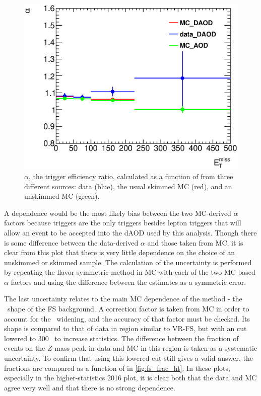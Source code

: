 \begin{centering}
\begin{figure}[!hbt]
\myfloatalign
\includegraphics[width=.85\linewidth]{figures/fs/trigger_ratios.eps}
\caption{$\alpha$, the trigger efficiency ratio, calculated as a function of \met from three different sources: data (blue), the usual skimmed \ttbar \ac{MC} (red), and an unskimmed \ttbar \ac{MC} (green).}
\label{fig:fs_alpha}
\end{figure}
\end{centering}

A \met dependence would be the most likely bias between the two \ac{MC}-derived $\alpha$ factors because \met triggers are the only triggers besides lepton triggers that will allow an event to be accepted into the \ac{dAOD} used by this analysis. Though there is some difference between the data-derived $\alpha$ and those taken from \ac{MC}, it is clear from this plot that there is very little dependence on the choice of an unskimmed or skimmed sample. The calculation of the uncertainty is performed by repeating the flavor symmetric method in \ac{MC} with each of the two \ac{MC}-based $\alpha$ factors and using the difference between the estimates as a symmetric error.

The last uncertainty relates to the main \ac{MC} dependence of the method - the \mll~shape of the \ac{FS} background. A correction factor is taken from \ac{MC} in order to account for the \mll~widening, and the accuracy of that factor must be checked. Its shape is compared to that of data in region similar to VR-FS, but with an \HT cut lowered to 300 \gev~to increase statistics. The difference between the fraction of events on the $Z$-mass peak in data and \ac{MC} in this region is taken as a systematic uncertainty. To confirm that using this lowered \HT cut still gives a valid answer, the fractions are compared as a function of \HT in \autoref{fig:fs_frac_ht}. In these plots, especially in the higher-statistics 2016 plot, it is clear both that the data and \ac{MC} agree very well and that there is no strong \HT dependence. 

